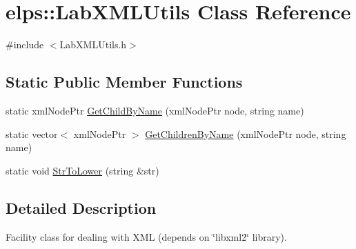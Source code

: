 \hypertarget{classelps_1_1_lab_x_m_l_utils}{\section{elps\-:\-:Lab\-X\-M\-L\-Utils Class Reference}
\label{classelps_1_1_lab_x_m_l_utils}
}


{\ttfamily \#include $<$Lab\-X\-M\-L\-Utils.\-h$>$}

\subsection*{Static Public Member Functions}
\begin{DoxyCompactItemize}
\item 
static xml\-Node\-Ptr \hyperlink{classelps_1_1_lab_x_m_l_utils_a4cd0f2dcacb57b50384c592c55dccc63}{Get\-Child\-By\-Name} (xml\-Node\-Ptr node, string name)
\item 
static vector$<$ xml\-Node\-Ptr $>$ \hyperlink{classelps_1_1_lab_x_m_l_utils_a7535c2a5de5aa80a4d2a84a90090d149}{Get\-Children\-By\-Name} (xml\-Node\-Ptr node, string name)
\item 
static void \hyperlink{classelps_1_1_lab_x_m_l_utils_aa027d214be66953afcba86e5384dcf70}{Str\-To\-Lower} (string \&str)
\end{DoxyCompactItemize}


\subsection{Detailed Description}
Facility class for dealing with X\-M\-L (depends on \char`\"{}libxml2\char`\"{} library). 

